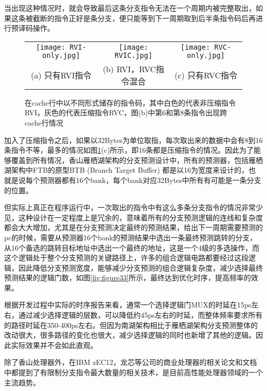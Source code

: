 当出现这种情况时，就会导致最后这条分支指令无法在一个周期内被完整取出，如果这条被截断的指令正好是条分支，便只能等到下一周期取到后半条指令码后再进行预译码操作。

\begin{figure}[htb]
    \centering
    \setlength\tabcolsep{3pt}  %
    \vspace{5pt} %
    \begin{tabular}{ccc}
        \texttt{[image: RVI-only.jpg]} &
        \texttt{[image: RVIC.jpg]} &
        \texttt{[image: RVC-only.jpg]} \\
        (a) 只有RVI指令 & (b) RVI，RVC指令混合 & (c) 只有RVC指令 \\[1ex]
    \end{tabular}
    \caption{在cache行中以不同形式储存的指令码，其中白色的代表非压缩指令RVI，灰色的代表压缩指令RVC，图(b)中第6和第8条指令出现跨cache行情况}
    \label{fig:figure31}
\end{figure}

加入了压缩指令之后，如果以32Bytes为单位取指，每次取出来的数据中会有8到16条指令不等，最多的情况如图\ref{fig:figure31}(c)所示，即16条都是压缩指令的情况。因此为了能够覆盖到所有情况，香山雁栖湖架构的分支预测设计中，所有的预测器，包括雁栖湖架构中FTB的原型BTB (Branch Target Buffer) 都是以16为宽度来设计的，也就是说每个预测器都有16个bank，每个bank对应32Bytes中所有有可能是一条分支的位置。

但实际上真正在程序运行中，一次取出的指令中有这么多条分支指令的情况非常少见，这种设计在一定程度上是冗余的，意味着所有的分支预测逻辑的连线和复杂度都会大大增加，尤其是在分支预测决定最终的预测结果，给出下一周期需要预测的pc的时候，需要从预测器16个bank的预测结果中选出一条最终预测跳转的分支，从16个备选的跳转目标地址中选出一个最终的地址，这是一个4级的多选操作，而这个逻辑处于整个分支预测的关键路径上，许多的组合逻辑电路都要经过这段逻辑，因此降低分支预测宽度，能够减少分支预测的组合逻辑复杂度，减少选择最终预测结果的逻辑门数，如图\ref{fig:figure33}所示，最终达到优化时序，提高频率的效果。

根据开发过程中实际的时序报告来看，通常一个选择逻辑门MUX的时延在15ps左右，通过减少选择逻辑的层数，可以降低约45ps左右的时延，而整体频率要求所有的路径时延在350-400ps左右。但因为南湖架构相比于雁栖湖架构分支预测整体的改动很大，很多路径的变化也很大，减少选择逻辑的同时也新增了其他的逻辑。因此实际效果并不会如此直观。

除了香山处理器外，在IBM zEC12\cite{ibm-zec12}，龙芯\cite{loongson}等公司的商业处理器的相关论文和文档中都提到了有限制分支指令最大数量的相关技术，是目前高性能处理器领域的一个主流趋势。

